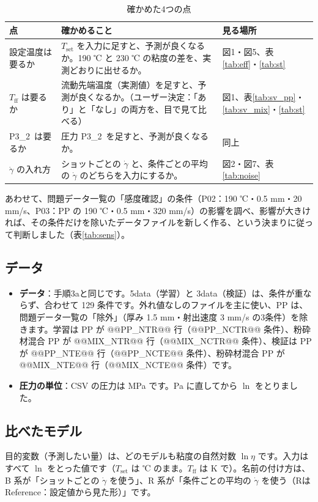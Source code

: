 \documentclass[paper=a4paper,fontsize=10.5pt,line_length=44zw,number_of_lines=38]{jlreq}
\newcommand{\gd}{\dot{\gamma}}
\newcommand{\PII}{P3\_2}
\newcommand{\Tff}{T_{\mathrm{ff}}}
\newcommand{\Tset}{T_{\mathrm{set}}}
\newenvironment{points}{\begin{itemize}[label=$\triangleright$,leftmargin=1.5\zw,itemsep=0.3ex,topsep=0.5ex,parsep=0pt]}{\end{itemize}}
\newcommand{\pt}[1]{\item \textbf{#1}：}
\begin{document}
\begin{table}[H]
\caption{確かめた4つの点}
\begin{tabularx}{\linewidth}{@{}>{\raggedright\arraybackslash}p{9\zw}>{\raggedright\arraybackslash}p{19\zw}X@{}}
\toprule
点 & 確かめること & 見る場所 \\
\midrule
1 設定温度は要るか & $\Tset$ を入力に足すと、予測が良くなるか。190 ℃ と 230 ℃ の粘度の差を、実測どおりに出せるか。 & 図1・図5、表\ref{tab:eff}・\ref{tab:st} \\
2 $\Tff$ は要るか & 流動先端温度（実測値）を足すと、予測が良くなるか。（ユーザー決定：「あり」と「なし」の両方を、目で見て比べる） & 図1、表\ref{tab:sv_pp}・\ref{tab:sv_mix}・\ref{tab:st} \\
3 \PII\ は要るか & 圧力 \PII\ を足すと、予測が良くなるか。 & 同上 \\
4 $\gd$ の入れ方 & ショットごとの $\gd$ と、条件ごとの平均の $\gd$ のどちらを入力にするか。 & 図2・図7、表\ref{tab:noise} \\
\bottomrule
\end{tabularx}
\end{table}

あわせて、問題データ一覧の「感度確認」の条件（P02：190 ℃・0.5 mm・20 mm/s、P03：PP の 190 ℃・0.5 mm・320 mm/s）の影響を調べ、影響が大きければ、その条件だけを除いたデータファイルを新しく作る、という決まりに従って判断しました（表\ref{tab:sens}）。

\subsection{データ}
\begin{points}
\pt{データ}手順3aと同じです。5data（学習）と 3data（検証）は、条件が重ならず、合わせて 129 条件です。外れ値なしのファイルを主に使い、PP は、問題データ一覧の「除外」（厚み 1.5 mm・射出速度 3 mm/s の3条件）を除きます。学習は PP が @@PP_NTR@@ 行（@@PP_NCTR@@ 条件）、粉砕材混合 PP が @@MIX_NTR@@ 行（@@MIX_NCTR@@ 条件）、検証は PP が @@PP_NTE@@ 行（@@PP_NCTE@@ 条件）、粉砕材混合 PP が @@MIX_NTE@@ 行（@@MIX_NCTE@@ 条件）です。
\pt{圧力の単位}CSV の圧力は MPa です。Pa に直してから $\ln$ をとりました。
\end{points}

\subsection{比べたモデル}
目的変数（予測したい量）は、どのモデルも粘度の自然対数 $\ln\eta$ です。入力はすべて $\ln$ をとった値です（$\Tset$ は ℃ のまま。$\Tff$ は K で）。名前の付け方は、B 系が「ショットごとの $\gd$ を使う」、R 系が「条件ごとの平均の $\gd$ を使う（Rは Reference：設定値から見た形）」です。
\end{document}
